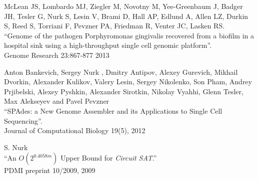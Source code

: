\begin{innerlist}
\blankline

\item McLean JS, Lombardo MJ, Ziegler M, Novotny M, Yee-Greenbaum J, Badger JH, Tesler G, Nurk S, Lesin V, Brami D, Hall AP, Edlund A, Allen LZ, Durkin S, Reed S, Torriani F, Pevzner PA, Friedman R, Venter JC, Lasken RS. \\
``Genome of the pathogen Porphyromonas gingivalis recovered from a biofilm in a hospital sink using a high-throughput single cell genomic platform''.\\
Genome Research 23:867-877 2013

\blankline

\item Anton Bankevich, Sergey Nurk %
, Dmitry Antipov, Alexey Gurevich, Mikhail Dvorkin, Alexander Kulikov, Valery Lesin, Sergey Nikolenko, Son Pham, Andrey Prjibelski, Alexey Pyshkin, Alexander Sirotkin, Nikolay Vyahhi, Glenn Tesler, Max Alekseyev and Pavel Pevzner\\
``SPAdes: a New Genome Assembler and its Applications to Single Cell Sequencing''.\\
Journal of Computational Biology 19(5), 2012

\blankline

\item S. Nurk\\
``An $O(2^{0.4058m})$ Upper Bound for \textit{Circuit SAT}.''\\
PDMI preprint 10/2009, 2009
\end{innerlist}

